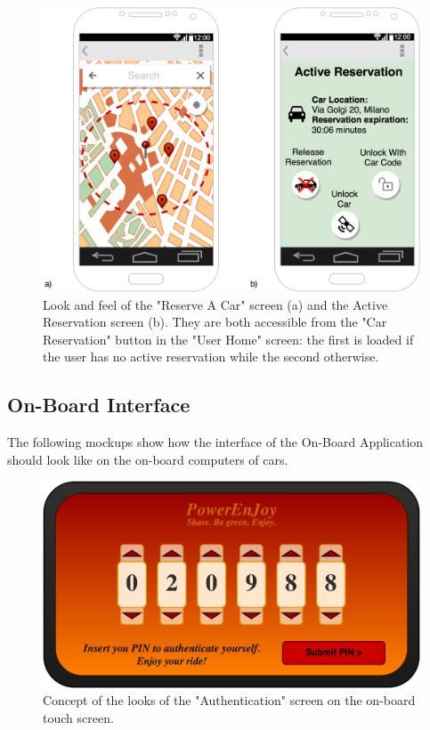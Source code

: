 \begin{figure}[h]
\centering
		\includegraphics[width=\textwidth]{./user_interface_design/diagrams/mobile_res_unlock.png}
		\caption{Look and feel of the "Reserve A Car" screen (a) and the Active Reservation screen (b). They are both accessible from the "Car Reservation" button in the "User Home" screen: the first is loaded if the user has no active reservation while the second otherwise.}
		\label{mobile_res_unlock}
\end{figure}

\subsection{On-Board Interface}
The following mockups show how the interface of the On-Board Application should look like on the on-board computers of cars.

\begin{figure}[h]
\centering
		\includegraphics[width=\textwidth]{./user_interface_design/diagrams/onboard_auth.png}
		\caption{Concept of the looks of the "Authentication" screen on the on-board touch screen.}
		\label{onboard_auth}
\end{figure}


